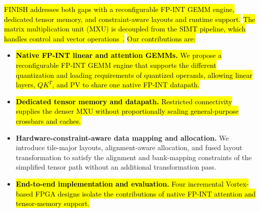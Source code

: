 \documentclass[sigconf,anonymous,nonacm]{acmart}
\newcommand{\ours}{\textsc{FINISH}}
\newcommand{\fpint}{FP-INT}
\DeclareRobustCommand{\rev}[1]{\hl{#1}}
\begin{document}
\rev{\ours{} addresses both gaps with a reconfigurable \fpint{} GEMM engine, dedicated tensor memory, and constraint-aware layouts and runtime support.} \rev{The matrix multiplication unit (MXU) is decoupled from the SIMT pipeline, which handles control and vector operations~\cite{virgo,gemmini}.} \rev{Our contributions are:}


\begin{itemize}
\item \rev{\textbf{Native \fpint{} linear and attention GEMMs.} We propose a reconfigurable \fpint{} GEMM engine that supports the different quantization and loading requirements of quantized operands, allowing linear layers, $QK^T$, and PV to share one native \fpint{} datapath.}

\item \rev{\textbf{Dedicated tensor memory and datapath.} Restricted connectivity supplies the denser MXU without proportionally scaling general-purpose crossbars and caches.}

\item \textbf{Hardware-constraint-aware data mapping and allocation.} We introduce tile-major layouts, alignment-aware allocation, and fused layout transformation to satisfy the alignment and bank-mapping constraints of the simplified tensor path without an additional transformation pass.

\item \rev{\textbf{End-to-end implementation and evaluation.} Four incremental Vortex-based FPGA designs isolate the contributions of native \fpint{} attention and tensor-memory support.}




\end{itemize}
\end{document}
